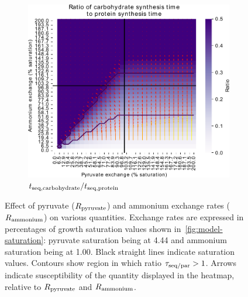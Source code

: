 \begin{figure}
  \begin{subfigure}[t]{0.45\textwidth}
  \centering
    \includegraphics[width=\linewidth]{ec_grid_pyr_amm_carb_to_prot}
    \caption{
      $t_{\mathrm{seq},\mathrm{carbohydrate}}/t_{\mathrm{seq},\mathrm{protein}}$
    }
    \label{fig:model-grid-pyr-carb-to-prot}
  \end{subfigure}
  \caption{
    Effect of pyruvate ($R_{\mathrm{pyruvate}}$) and ammonium exchange rates ($R_{\mathrm{ammonium}}$) on various quantities.
    Exchange rates are expressed in percentages of growth saturation values shown in~\ref{fig:model-saturation}: pyruvate saturation being at \SI{4.44}{\mmolgdwh} and ammonium saturation being at \SI{1.00}{\mmolgdwh}.
    Black straight lines indicate saturation values.
    Contours show region in which ratio $\tau_{\mathrm{seq}/\mathrm{par}} > 1$.
    Arrows indicate susceptibility of the quantity displayed in the heatmap, relative to $R_{\mathrm{pyruvate}}$ and $R_{\mathrm{ammonium}}$.
  }
  \label{fig:model-grid-pyr}
\end{figure}

